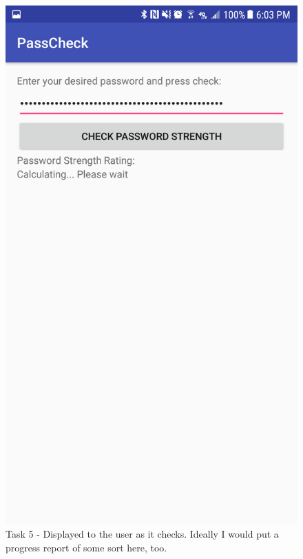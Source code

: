 \documentclass{article}
\makeatletter
\def\maxwidth#1{\ifdim\Gin@nat@width>#1 #1\else\Gin@nat@width\fi}
\makeatother
\begin{document}
	\begin{figure}[ht]
		\includegraphics[width=\maxwidth{3in}]{img/t5s2.png}
		\centering
        \caption{Task 5 - Displayed to the user as it checks. Ideally I would put a progress report of some sort here, too.}
	\end{figure}
\end{document}
